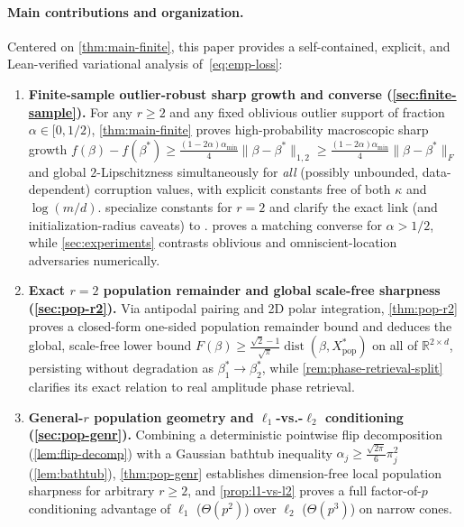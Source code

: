 \documentclass[11pt]{article}
\theoremstyle{plain}
\theoremstyle{remark}
\numberwithin{equation}{section}
\newcommand{\R}{\mathbb{R}}
\newcommand{\dist}{\operatorname{dist}}
\newcommand{\Fnorm}[1]{\|#1\|_F}
\newcommand{\Lonenorm}[1]{\|#1\|_{1,2}}
\begin{document}
\paragraph{Main contributions and organization.}
Centered on \cref{thm:main-finite}, this paper provides a self-contained, explicit, and Lean-verified variational analysis of~\eqref{eq:emp-loss}:
\begin{enumerate}
  \item \textbf{Finite-sample outlier-robust sharp growth and converse (\cref{sec:finite-sample}).} For any $r \ge 2$ and any fixed oblivious outlier support of fraction $\alpha \in [0, 1/2)$, \cref{thm:main-finite} proves high-probability macroscopic sharp growth $f(\beta) - f(\beta^*) \ge \frac{(1-2\alpha)\alpha_{\min}}{4}\Lonenorm{\beta - \beta^*} \ge \frac{(1-2\alpha)\alpha_{\min}}{4}\Fnorm{\beta - \beta^*}$ and global $2$-Lipschitzness simultaneously for \emph{all} (possibly unbounded, data-dependent) corruption values, with explicit constants free of both $\kappa$ and $\log(m/d)$.  specialize constants for $r = 2$ and clarify the exact link (and initialization-radius caveats) to \cite{charisopoulos2024superpolyak}.  proves a matching converse for $\alpha > 1/2$, while \cref{sec:experiments} contrasts oblivious and omniscient-location adversaries numerically.
  \item \textbf{Exact $r = 2$ population remainder and global scale-free sharpness (\cref{sec:pop-r2}).} Via antipodal pairing and 2D polar integration, \cref{thm:pop-r2} proves a closed-form one-sided population remainder bound and deduces the global, scale-free lower bound $F(\beta) \ge \frac{\sqrt{2}-1}{\sqrt{\pi}}\dist(\beta, X_{\mathrm{pop}}^*)$ on all of $\R^{2 \times d}$, persisting without degradation as $\beta_1^* \to \beta_2^*$, while \cref{rem:phase-retrieval-split} clarifies its exact relation to real amplitude phase retrieval.
  \item \textbf{General-$r$ population geometry and $\ell_1$-vs.-$\ell_2$ conditioning (\cref{sec:pop-genr}).} Combining a deterministic pointwise flip decomposition (\cref{lem:flip-decomp}) with a Gaussian bathtub inequality $\alpha_j \ge \frac{\sqrt{2\pi}}{6}\pi_j^2$ (\cref{lem:bathtub}), \cref{thm:pop-genr} establishes dimension-free local population sharpness for arbitrary $r \ge 2$, and \cref{prop:l1-vs-l2} proves a full factor-of-$p$ conditioning advantage of $\ell_1$ ($\Theta(p^2)$) over $\ell_2$ ($\Theta(p^3)$) on narrow cones.

\end{enumerate}
\end{document}
